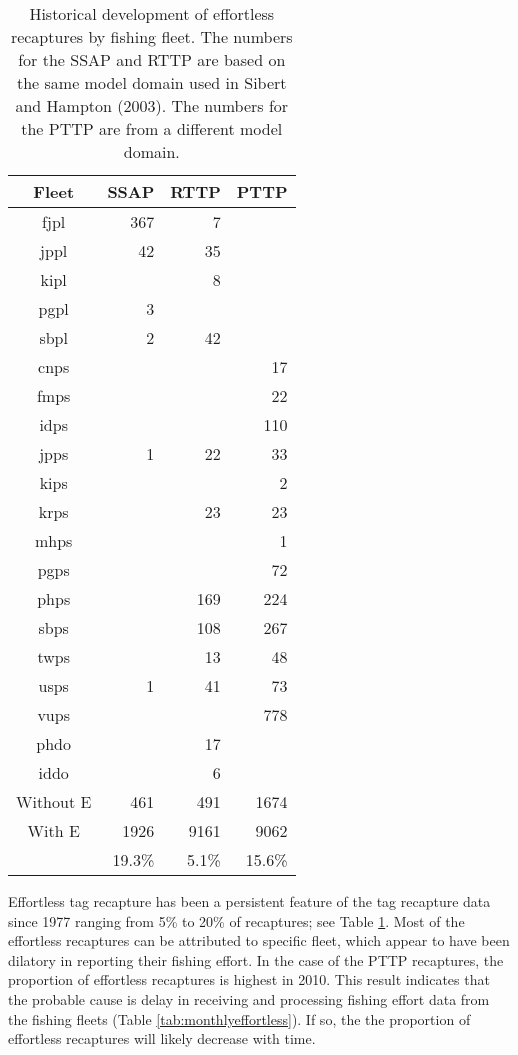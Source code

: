 \begin{table}
\caption[Effortless recaptures by fleet]{Historical development of
effortless recaptures by fishing fleet. The numbers for the SSAP and
RTTP are based on the same model domain used in Sibert and Hampton
(2003). The numbers for the PTTP are from a different model domain.}
\label{tab:fleeteffortless}
\begin{center}
\begin{tabular}{crrr}
\hline
Fleet & SSAP & RTTP & PTTP\\
\hline
 fjpl & 367  &    7 \\
 jppl &  42  &   35 \\
 kipl &      &    8 \\
 pgpl &   3  \\
 sbpl &   2  &   42 \\
 cnps &      &       &    17 \\
 fmps &       &      &22 \\
 idps &      &       & 110 \\
 jpps &   1  &   22 & 33 \\
 kips &      &      &   2 \\
 krps &      &   23   & 23 \\
 mhps &      &       &   1 \\
 pgps &      &       &  72 \\
 phps &      &  169  & 224 \\
 sbps &      &  108  & 267 \\
 twps &      &   13  &  48 \\
 usps &   1  &   41  & 73 \\
 vups &      &       & 778 \\
 phdo &      &   17 \\
 iddo &      &    6 \\
\hline
Without E& 461 & 491 & 1674 \\
 With E  & 1926   & 9161 & 9062 \\
        & 19.3\% & 5.1\% & 15.6\%\\
\hline
\end{tabular}
\end{center}
\end{table}

Effortless tag recapture has been a persistent feature of the tag
recapture data since 1977 ranging from 5\% to 20\% of recaptures; 
see Table \ref{tab:fleeteffortless}. Most
of the effortless recaptures can be attributed to specific fleet,
which appear to have been dilatory in reporting their fishing effort.
In the case of the PTTP recaptures, the proportion of effortless
recaptures is highest in 2010. This result indicates that the probable
cause is delay in receiving and processing fishing effort data from
the fishing fleets (Table \ref{tab:monthlyeffortless}). If so, the
the proportion of effortless recaptures will likely decrease with time.

